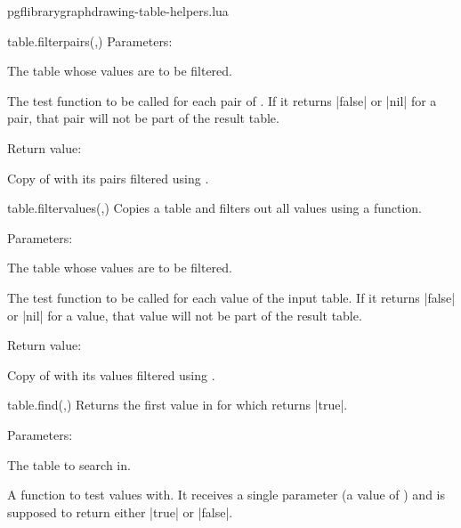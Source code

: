 \begin{filedescription}{pgflibrarygraphdrawing-table-helpers.lua}
\begin{luacommand}{{table.filter\textunderscore{}pairs}(,)}
Parameters:
\begin{parameterdescription}
	\item[\meta{table}] The table whose values are to be filtered.\item[\meta{filter\_func}] The test function to be called for each pair of . If it returns |false| or |nil| for a pair, that pair will not be part of the result table. 
\end{parameterdescription}


Return value:
\begin{parameterdescription} 
  \item[] Copy of  with its pairs filtered using . 
\end{parameterdescription}


\end{luacommand}
\begin{luacommand}{{table.filter\textunderscore{}values}(,)}
Copies a table and filters out all values using a function. 

Parameters:
\begin{parameterdescription}
	\item[\meta{input}] The table whose values are to be filtered.\item[\meta{filter\_func}] The test function to be called for each value of the input table. If it returns |false| or |nil| for a value, that value will not be part of the result table. 
\end{parameterdescription}


Return value:
\begin{parameterdescription} 
  \item[] Copy of  with its values filtered using . 
\end{parameterdescription}


\end{luacommand}
\begin{luacommand}{{table.find}(,)}
Returns the first value in  for which  returns |true|. 

Parameters:
\begin{parameterdescription}
	\item[\meta{table}] The table to search in.\item[\meta{find\_func}] A function to test values with. It receives a single parameter (a value of ) and is supposed to return either |true| or |false|. 
\end{parameterdescription}



\end{luacommand}
\end{filedescription}
